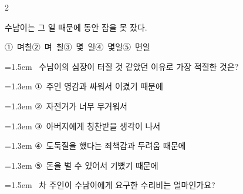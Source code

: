 \documentclass[11pt, a4paper]{article}
\begin{document}
\begin{multicols}{2}
\begin{minipage}{\columnwidth}
\vspace{1mm}
\begin{boxibox}
수남이는 그 일 때문에 \underline{\hspace{3cm}} 동안 잠을 못 잤다. \\
\end{boxibox}
\vspace{1mm}

\vspace{0.5mm}
\noindent
\mbox{①~며칠}\hspace{1em}\mbox{②~며 칠}\hspace{1em}\mbox{③~몇 일}\hspace{1em}\mbox{④~몇일}\hspace{1em}\mbox{⑤~면일}

\vspace{4mm}
\end{minipage}
\par

\noindent\begin{minipage}{\columnwidth}
\vspace{2mm}
{\hangindent=1.5em  ~수남이의 심장이 터질 것 같았던 이유로 가장 적절한 것은?\par}

\vspace{0.5mm}
{\hangindent=1.3em  \noindent\hspace{0.3em}①~주인 영감과 싸워서 이겼기 때문에\par}
{\hangindent=1.3em  \noindent\hspace{0.3em}②~자전거가 너무 무거워서\par}
{\hangindent=1.3em  \noindent\hspace{0.3em}③~아버지에게 칭찬받을 생각이 나서\par}
{\hangindent=1.3em  \noindent\hspace{0.3em}④~도둑질을 했다는 죄책감과 두려움 때문에\par}
{\hangindent=1.3em  \noindent\hspace{0.3em}⑤~돈을 벌 수 있어서 기뻤기 때문에\par}
\vspace{4mm}
\end{minipage}
\par

\noindent\begin{minipage}{\columnwidth}
\vspace{2mm}
{\hangindent=1.5em  ~차 주인이 수남이에게 요구한 수리비는 얼마인가요?\par}


\end{minipage}
\end{multicols}
\end{document}
